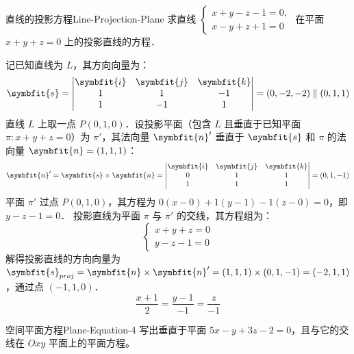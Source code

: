 \begin{problem}{直线的投影方程}{Line-Projection-Plane}
    求直线 $\begin{cases} x + y - z - 1 = 0, \\ x - y + z + 1 = 0 \end{cases}$ 在平面 $x + y + z = 0$ 上的投影直线的方程．
\end{problem}

\begin{solution}
    记已知直线为 $L$，其方向向量为：
    \begin{equation*}
        \symbfit{s} = \begin{vmatrix} \symbfit{i} & \symbfit{j} & \symbfit{k} \\ 1 & 1 & -1 \\ 1 & -1 & 1 \end{vmatrix} = (0, -2, -2) \parallel (0, 1, 1)
    \end{equation*}
    直线 $L$ 上取一点 $P(0, 1, 0)$．设投影平面（包含 $L$ 且垂直于已知平面 $\pi: x + y + z = 0$）为 $\pi'$，其法向量 $\symbfit{n}'$ 垂直于 $\symbfit{s}$ 和 $\pi$ 的法向量 $\symbfit{n} = (1, 1, 1)$：
    \begin{equation*}
        \symbfit{n}' = \symbfit{s} \times \symbfit{n} = \begin{vmatrix} \symbfit{i} & \symbfit{j} & \symbfit{k} \\ 0 & 1 & 1 \\ 1 & 1 & 1 \end{vmatrix} = (0, 1, -1)
    \end{equation*}
    平面 $\pi'$ 过点 $P(0, 1, 0)$，其方程为 $0(x - 0) + 1(y - 1) - 1(z - 0) = 0$，即 $y - z - 1 = 0$．
    投影直线为平面 $\pi$ 与 $\pi'$ 的交线，其方程组为：
    \begin{equation*}
        \begin{cases} x + y + z = 0 \\ y - z - 1 = 0 \end{cases}
    \end{equation*}
    解得投影直线的方向向量为 $\symbfit{s}_{proj} = \symbfit{n} \times \symbfit{n}' = (1, 1, 1) \times (0, 1, -1) = (-2, 1, 1)$，通过点 $(-1, 1, 0)$．
    \begin{equation*}
        \boxed{\frac{x + 1}{2} = \frac{y - 1}{-1} = \frac{z}{-1}}
    \end{equation*}
\end{solution}


\begin{problem}{空间平面方程}{Plane-Equation-4}
    写出垂直于平面 $5x - y + 3z - 2 = 0$，且与它的交线在 $Oxy$ 平面上的平面方程。
\end{problem}

